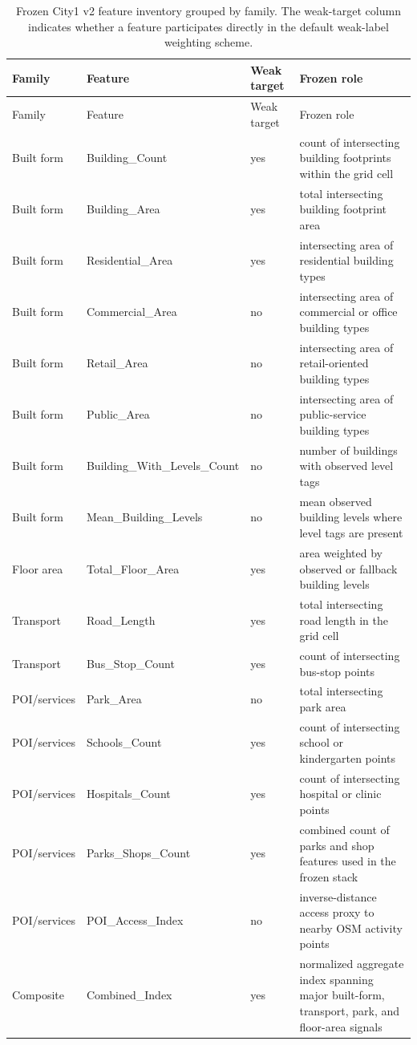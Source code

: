 \begingroup
\small
\setlength{\LTleft}{0pt}
\setlength{\LTright}{0pt}
\begin{longtable}{L{0.15\textwidth} L{0.22\textwidth} L{0.11\textwidth} L{0.40\textwidth}}
\caption{Frozen City1 v2 feature inventory grouped by family. The weak-target column indicates whether a feature participates directly in the default weak-label weighting scheme.}\label{tab:s3_feature_inventory}\\
\toprule
Family & Feature & Weak target & Frozen role \\
\midrule
\endfirsthead
\toprule
Family & Feature & Weak target & Frozen role \\
\midrule
\endhead
\bottomrule
\endfoot
Built form & Building\_Count & yes & count of intersecting building footprints within the grid cell \\
Built form & Building\_Area & yes & total intersecting building footprint area \\
Built form & Residential\_Area & yes & intersecting area of residential building types \\
Built form & Commercial\_Area & no & intersecting area of commercial or office building types \\
Built form & Retail\_Area & no & intersecting area of retail-oriented building types \\
Built form & Public\_Area & no & intersecting area of public-service building types \\
Built form & Building\_With\_Levels\_Count & no & number of buildings with observed level tags \\
Built form & Mean\_Building\_Levels & no & mean observed building levels where level tags are present \\
Floor area & Total\_Floor\_Area & yes & area weighted by observed or fallback building levels \\
Transport & Road\_Length & yes & total intersecting road length in the grid cell \\
Transport & Bus\_Stop\_Count & yes & count of intersecting bus-stop points \\
POI/services & Park\_Area & no & total intersecting park area \\
POI/services & Schools\_Count & yes & count of intersecting school or kindergarten points \\
POI/services & Hospitals\_Count & yes & count of intersecting hospital or clinic points \\
POI/services & Parks\_Shops\_Count & yes & combined count of parks and shop features used in the frozen stack \\
POI/services & POI\_Access\_Index & no & inverse-distance access proxy to nearby OSM activity points \\
Composite & Combined\_Index & yes & normalized aggregate index spanning major built-form, transport, park, and floor-area signals \\
\end{longtable}
\endgroup

